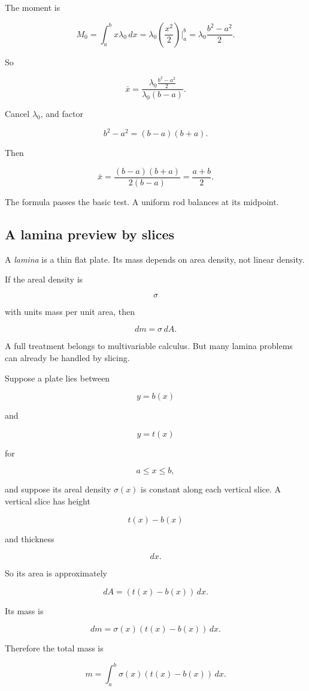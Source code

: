 The moment is

\[
M_0=\int_a^b x\lambda_0\,dx
=
\lambda_0\left(\frac{x^2}{2}\right)\Big|_a^b
=
\lambda_0\frac{b^2-a^2}{2}.
\]

So

\[
\bar x
=
\frac{\lambda_0\frac{b^2-a^2}{2}}{\lambda_0(b-a)}.
\]

Cancel \(\lambda_0\), and factor

\[
b^2-a^2=(b-a)(b+a).
\]

Then

\[
\bar x
=
\frac{(b-a)(b+a)}{2(b-a)}
=
\boxed{\frac{a+b}{2}}.
\]

The formula passes the basic test.  A uniform rod balances at its midpoint.

\subsection{A lamina preview by slices}
\label{subsec:lamina-preview-slices}

A \emph{lamina} is a thin flat plate.  Its mass depends on area density, not linear
density.

If the areal density is

\[
\sigma
\]

with units mass per unit area, then

\[
dm=\sigma\,dA.
\]

A full treatment belongs to multivariable calculus.  But many lamina problems can
already be handled by slicing.

Suppose a plate lies between

\[
y=b(x)
\]

and

\[
y=t(x)
\]

for

\[
a\le x\le b,
\]

and suppose its areal density \(\sigma(x)\) is constant along each vertical slice.  A
vertical slice has height

\[
t(x)-b(x)
\]

and thickness

\[
dx.
\]

So its area is approximately

\[
dA=(t(x)-b(x))\,dx.
\]

Its mass is

\[
dm=\sigma(x)(t(x)-b(x))\,dx.
\]

Therefore the total mass is

\[
\boxed{
m=\int_a^b \sigma(x)(t(x)-b(x))\,dx.
}
\]

